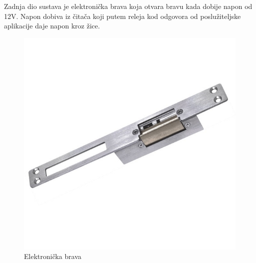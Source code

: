 \documentclass[times, utf8, zavrsni]{fer}
\begin{document}
Zadnja dio sustava je elektronička brava koja otvara bravu kada dobije napon od 12V. Napon dobiva iz čitača koji putem releja kod odgovora od poslužiteljske aplikacije daje napon kroz žice. 

\begin{figure}[h]
\includegraphics[scale=1]{brava.jpg}
\centering
\caption{Elektronička brava}
\centering
\end{figure}
\end{document}
